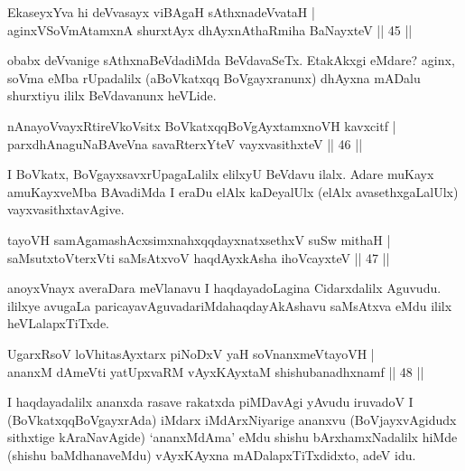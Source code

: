 
\begin{shl}
EkaseyxYva hi deVvasayx viBAgaH sAthxnadeVvataH |\\
aginxVSoVmAtamxnA shurxtAyx dhAyxnAthaRmiha BaNayxteV \hfill || 45 || 
\end{shl}

\begin{artha}
obabx deVvanige sAthxnaBeVdadiMda BeVdavaSeTx. EtakAkxgi eMdare? aginx, soVma eMba rUpadalilx (aBoVkatxqq BoVgayxranunx) dhAyxna mADalu shurxtiyu ililx BeVdavanunx heVLide.
\end{artha}

\begin{shl}
nAnayoVvayxRtireVkoV\s sitx BoVkatxqqBoVgAyxtamxnoVH kavxcitf |\\
parxdhAnaguNaBAveVna savaRterxYteV vayxvasithxteV \hfill || 46 || 
\end{shl}

\begin{artha}
I BoVkatx, BoVgayxsavxrUpagaLalilx elilxyU BeVdavu ilalx. Adare muKayx amuKayxveMba BAvadiMda I eraDu elAlx kaDeyalUlx (elAlx avasethxgaLalUlx) vayxvasithxtavAgive.
\end{artha}


\begin{shl}
tayoVH samAgamashAcxsimxnahxqqdayxnatxsethxV suSw mithaH |\\
saMsutxtoV\s terxVti saMsAtxvoV haqdAyxkAsha ihoVcayxteV \hfill || 47 || 
\end{shl}

\begin{artha}
anoyxVnayx averaDara meVlanavu I haqdayadoLagina Cidarxdalilx Aguvudu. ililxye avugaLa paricayavAguvadariMda\break haqdayAkAshavu saMsAtxva eMdu ililx heVLalapxTiTxde.
\end{artha}


\begin{shl}
UgarxRsoV loVhitasAyxtarx piNoDxV yaH soV\s nanxmeVtayoVH |\\
ananxM dAmeVti yatUpxvaRM vAyxKAyxtaM shishubanadhxnamf \hfill || 48 || 
\end{shl}

\begin{artha}
I haqdayadalilx ananxda rasave rakatxda piMDavAgi yAvudu iruvadoV I (BoVkatxqqBoVgayxrAda) iMdarx iMdArxNiyarige ananxvu (BoVjayxvAgidudx sithxtige kAraNavAgide) `ananxMdAma' eMdu shishu bArxhamxNadalilx hiMde (shishu baMdhanaveMdu) vAyxKAyxna mADalapxTiTxdidxto, adeV idu.
\end{artha}

